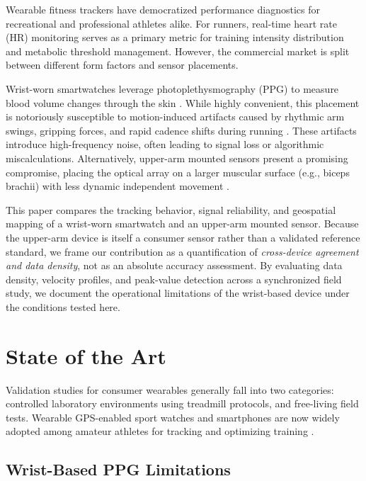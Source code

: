 \documentclass{acmsiggraph}
\begin{document}
Wearable fitness trackers have democratized performance diagnostics for
recreational and professional athletes alike. For runners, real-time
heart rate (HR) monitoring serves as a primary metric for training
intensity distribution and metabolic threshold management. However, the
commercial market is split between different form factors and sensor
placements.

Wrist-worn smartwatches leverage photoplethysmography (PPG) to measure
blood volume changes through the skin \cite{kim_photoplethysmography_2023}. While highly
convenient, this placement is notoriously susceptible to motion-induced
artifacts caused by rhythmic arm swings, gripping forces, and rapid
cadence shifts during running \cite{kim_photoplethysmography_2023,schweizer2024heart}. These
artifacts introduce high-frequency noise, often leading to signal loss
or algorithmic miscalculations. Alternatively, upper-arm mounted sensors
present a promising compromise, placing the optical array on a larger
muscular surface (e.g., biceps brachii) with less dynamic independent
movement \cite{schweizer2024heart}.

This paper compares the tracking behavior, signal reliability, and
geospatial mapping of a wrist-worn smartwatch and an upper-arm mounted
sensor. Because the upper-arm device is itself a consumer sensor rather
than a validated reference standard, we frame our contribution as a
quantification of \emph{cross-device agreement and data density}, not as
an absolute accuracy assessment. By evaluating data density, velocity
profiles, and peak-value detection across a synchronized field study, we
document the operational limitations of the wrist-based device under the
conditions tested here.

\section{State of the Art}

Validation studies for consumer wearables generally fall into two
categories: controlled laboratory environments using treadmill protocols,
and free-living field tests. Wearable GPS-enabled sport watches and
smartphones are now widely adopted among amateur athletes for tracking
and optimizing training \cite{pobiruchin2017accuracy}.

\subsection{Wrist-Based PPG Limitations}
\end{document}
